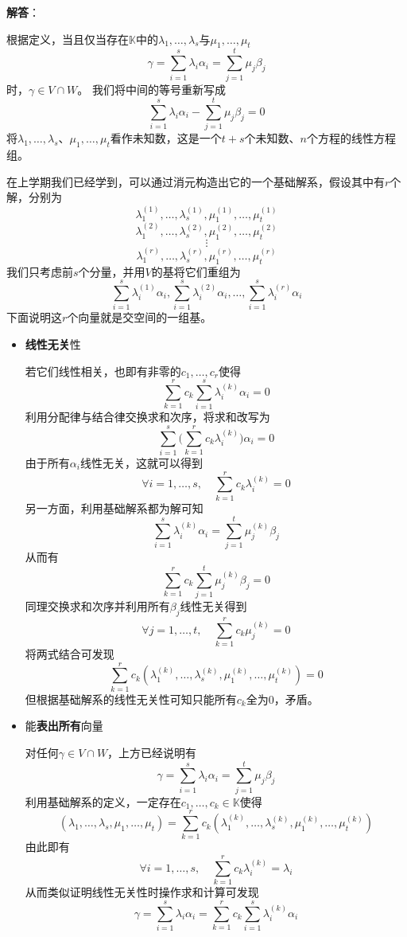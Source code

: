 \documentclass[a4paper,UTF8,fontset=windows,AutoFakeBold]{ctexart}
\newcommand{\sol}[1]{{\vspace{5pt}\kaishu\noindent\textbf{解答}：\vspace{-3pt}
\begin{compactitem}
    \item[] #1
\end{compactitem}
}}
\begin{document}
\sol{
    根据定义，当且仅当存在$\mathbb{K}$中的$\lambda_1,\dots,\lambda_s$与$\mu_1,\dots,\mu_t$
    $$\gamma=\sum_{i=1}^s\lambda_i\alpha_i=\sum_{j=1}^t\mu_j\beta_j$$
    时，$\gamma\in V\cap W$。
    我们将中间的等号重新写成
    $$\sum_{i=1}^s\lambda_i\alpha_i-\sum_{j=1}^t\mu_j\beta_j=0$$
    将$\lambda_1,\dots,\lambda_s$、$\mu_1,\dots,\mu_t$看作未知数，这是一个$t+s$个未知数、$n$个方程的线性方程组。

    在上学期我们已经学到，可以通过消元构造出它的一个基础解系，假设其中有$r$个解，分别为
    $$\lambda_1^{(1)},\dots,\lambda_s^{(1)},\mu_1^{(1)},\dots,\mu_t^{(1)}$$
    $$\lambda_1^{(2)},\dots,\lambda_s^{(2)},\mu_1^{(2)},\dots,\mu_t^{(2)}$$
    $$\vdots$$
    $$\lambda_1^{(r)},\dots,\lambda_s^{(r)},\mu_1^{(r)},\dots,\mu_t^{(r)}$$
    我们只考虑前$s$个分量，并用$V$的基将它们重组为
    $$\sum_{i=1}^s\lambda_i^{(1)}\alpha_i,\sum_{i=1}^s\lambda_i^{(2)}\alpha_i,\dots,\sum_{i=1}^s\lambda_i^{(r)}\alpha_i$$
    下面说明这$r$个向量就是交空间的一组基。
    \begin{itemize}
        \item \textbf{线性无关}性
        
        若它们线性相关，也即有非零的$c_1,\dots,c_r$使得
        $$\sum_{k=1}^rc_k\sum_{i=1}^s\lambda_i^{(k)}\alpha_i=0$$
        利用分配律与结合律交换求和次序，将求和改写为
        $$\sum_{i=1}^s\bigg(\sum_{k=1}^rc_k\lambda_i^{(k)}\bigg)\alpha_i=0$$
        由于所有$\alpha_i$线性无关，这就可以得到
        $$\forall i=1,\dots,s,\quad\sum_{k=1}^rc_k\lambda_i^{(k)}=0$$
        另一方面，利用基础解系都为解可知
        $$\sum_{i=1}^s\lambda_i^{(k)}\alpha_i=\sum_{j=1}^t\mu_j^{(k)}\beta_j$$
        从而有
        $$\sum_{k=1}^rc_k\sum_{j=1}^t\mu_j^{(k)}\beta_j=0$$
        同理交换求和次序并利用所有$\beta_j$线性无关得到
        $$\forall j=1,\dots,t,\quad\sum_{k=1}^rc_k\mu_j^{(k)}=0$$
        将两式结合可发现
        $$\sum_{k=1}^rc_k(\lambda_1^{(k)},\dots,\lambda_s^{(k)},\mu_1^{(k)},\dots,\mu_t^{(k)})=0$$
        但根据基础解系的线性无关性可知只能所有$c_k$全为0，矛盾。

        \item 能\textbf{表出所有}向量
        
        对任何$\gamma\in V\cap W$，上方已经说明有
        $$\gamma=\sum_{i=1}^s\lambda_i\alpha_i=\sum_{j=1}^t\mu_j\beta_j$$
        利用基础解系的定义，一定存在$c_1,\dots,c_k\in\mathbb{K}$使得
        $$(\lambda_1,\dots,\lambda_s,\mu_1,\dots,\mu_t)=\sum_{k=1}^rc_k(\lambda_1^{(k)},\dots,\lambda_s^{(k)},\mu_1^{(k)},\dots,\mu_t^{(k)})$$
        由此即有
        $$\forall i=1,\dots,s,\quad\sum_{k=1}^rc_k\lambda_i^{(k)}=\lambda_i$$
        从而类似证明线性无关性时操作求和计算可发现
        $$\gamma=\sum_{i=1}^s\lambda_i\alpha_i=\sum_{k=1}^rc_k\sum_{i=1}^s\lambda_i^{(k)}\alpha_i$$
    \end{itemize}

}
\end{document}
